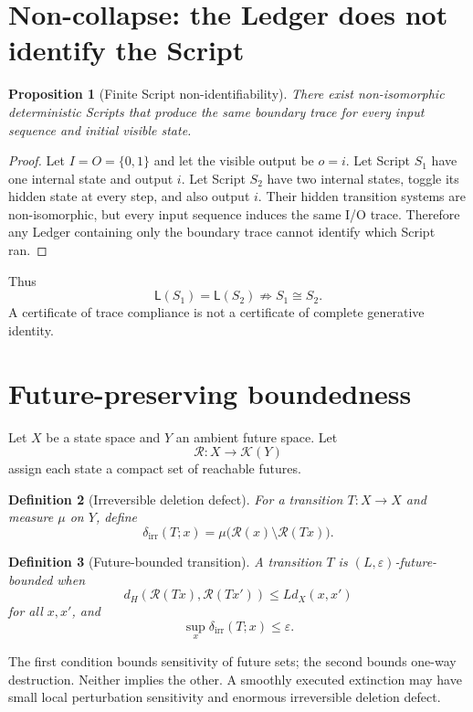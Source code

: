 \documentclass[11pt]{article}
\newtheorem{definition}{Definition}[section]
\newtheorem{proposition}[definition]{Proposition}
\newcommand{\Ledger}{\mathsf{L}}
\newcommand{\Reach}{\mathcal{R}}
\begin{document}
\section{Non-collapse: the Ledger does not identify the Script}

\begin{proposition}[Finite Script non-identifiability]
There exist non-isomorphic deterministic Scripts that produce the same boundary trace for every input sequence and initial visible state.
\end{proposition}

\begin{proof}
Let $I=O=\{0,1\}$ and let the visible output be $o=i$. Let Script $S_1$ have one internal state and output $i$. Let Script $S_2$ have two internal states, toggle its hidden state at every step, and also output $i$. Their hidden transition systems are non-isomorphic, but every input sequence induces the same I/O trace. Therefore any Ledger containing only the boundary trace cannot identify which Script ran.
\end{proof}

Thus
\[
\Ledger(S_1)=\Ledger(S_2)
\not\Longrightarrow
S_1\cong S_2.
\]
A certificate of trace compliance is not a certificate of complete generative identity.

\section{Future-preserving boundedness}

Let $X$ be a state space and $Y$ an ambient future space. Let
\[
\Reach:X\to\mathcal K(Y)
\]
assign each state a compact set of reachable futures.

\begin{definition}[Irreversible deletion defect]
For a transition $T:X\to X$ and measure $\mu$ on $Y$, define
\[
\delta_{\mathrm{irr}}(T;x)
=
\mu\bigl(\Reach(x)\setminus\Reach(Tx)\bigr).
\]
\end{definition}

\begin{definition}[Future-bounded transition]
A transition $T$ is $(L,\varepsilon)$-future-bounded when
\[
d_H(\Reach(Tx),\Reach(Tx'))\le Ld_X(x,x')
\]
for all $x,x'$, and
\[
\sup_x\delta_{\mathrm{irr}}(T;x)\le\varepsilon.
\]
\end{definition}

The first condition bounds sensitivity of future sets; the second bounds one-way destruction. Neither implies the other. A smoothly executed extinction may have small local perturbation sensitivity and enormous irreversible deletion defect.
\end{document}
